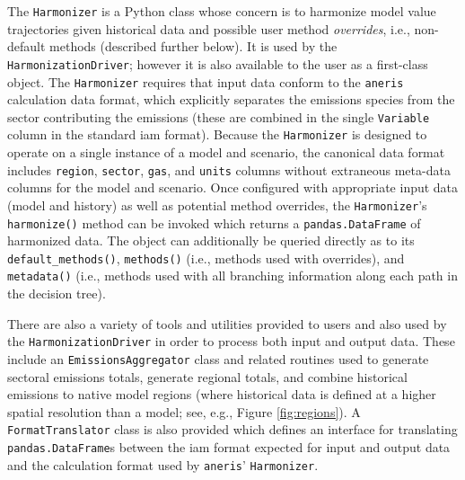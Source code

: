 \documentclass[review]{elsarticle}
\newcommand{\code}[1]{\lstinline[basicstyle=\ttfamily\color{black}]|#1|}
\begin{document}
The \texttt{Harmonizer} is a Python class whose concern is to harmonize model
value trajectories given historical data and possible user method
\textit{overrides}, i.e., non-default methods (described further below). It is
used by the \texttt{HarmonizationDriver}; however it is also available to the
user as a first-class object. The \texttt{Harmonizer} requires that input data
conform to the \code{aneris} calculation data format, which explicitly separates
the emissions species from the sector contributing the emissions (these are
combined in the single \code{Variable} column in the standard \gls{iam}
format). Because the \texttt{Harmonizer} is designed to operate on a single
instance of a model and scenario, the canonical data format includes
\texttt{region}, \texttt{sector}, \texttt{gas}, and \texttt{units} columns
without extraneous meta-data columns for the model and scenario. Once configured
with appropriate input data (model and history) as well as potential method
overrides, the \texttt{Harmonizer}'s \texttt{harmonize()} method can be invoked
which returns a \texttt{pandas.DataFrame} of harmonized data. The object can
additionally be queried directly as to its \texttt{default\_methods()},
\texttt{methods()} (i.e., methods used with overrides), and \texttt{metadata()}
(i.e., methods used with all branching information along each path in the
decision tree).

There are also a variety of tools and utilities provided to users and also used
by the \texttt{HarmonizationDriver} in order to process both input and output
data. These include an \texttt{EmissionsAggregator} class and related routines
used to generate sectoral emissions totals, generate regional totals, and
combine historical emissions to native model regions (where historical data is
defined at a higher spatial resolution than a model; see, e.g., Figure
\ref{fig:regions}). A \texttt{FormatTranslator} class is also provided which
defines an interface for translating \texttt{pandas.DataFrame}s between the \gls{iam}
format expected for input and output data and the calculation format used by
\code{aneris}' \texttt{Harmonizer}.
\end{document}
